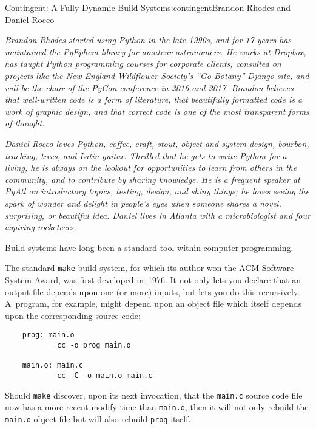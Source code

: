 \begin{aosachapter}{Contingent: A Fully Dynamic Build System}{s:contingent}{Brandon Rhodes and Daniel Rocco}

\emph{Brandon Rhodes started using Python in the late 1990s, and for 17
years has maintained the PyEphem library for amateur astronomers. He
works at Dropbox, has taught Python programming courses for corporate
clients, consulted on projects like the New England Wildflower Society's
``Go Botany'' Django site, and will be the chair of the PyCon conference
in 2016 and 2017. Brandon believes that well-written code is a form of
literature, that beautifully formatted code is a work of graphic design,
and that correct code is one of the most transparent forms of thought.}

\emph{Daniel Rocco loves Python, coffee, craft, stout, object and system
design, bourbon, teaching, trees, and Latin guitar. Thrilled that he
gets to write Python for a living, he is always on the lookout for
opportunities to learn from others in the community, and to contribute
by sharing knowledge. He is a frequent speaker at PyAtl on introductory
topics, testing, design, and shiny things; he loves seeing the spark of
wonder and delight in people's eyes when someone shares a novel,
surprising, or beautiful idea. Daniel lives in Atlanta with a
microbiologist and four aspiring rocketeers.}

\label{introduction}

Build systems have long been a standard tool within computer
programming.

The standard \texttt{make} build system, for which its author won the
ACM Software System Award, was first developed in~1976. It not only lets
you declare that an output file depends upon one (or more) inputs, but
lets you do this recursively. A~program, for example, might depend upon
an object file which itself depends upon the corresponding source code:

\begin{verbatim}
    prog: main.o
            cc -o prog main.o

    main.o: main.c
            cc -C -o main.o main.c
\end{verbatim}

Should \texttt{make} discover, upon its next invocation, that the
\texttt{main.c} source code file now has a more recent modify time than
\texttt{main.o}, then it will not only rebuild the \texttt{main.o}
object file but will also rebuild \texttt{prog} itself.


\end{aosachapter}
